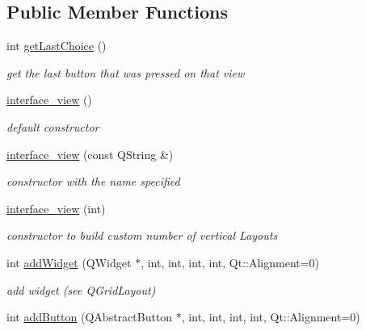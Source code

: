 \subsection*{Public Member Functions}
\begin{CompactItemize}
\item 
\hypertarget{classinterface__view_6c9506e36ddc99d55082b465e7fe89e7}{
int \hyperlink{classinterface__view_6c9506e36ddc99d55082b465e7fe89e7}{getLastChoice} ()}
\label{classinterface__view_6c9506e36ddc99d55082b465e7fe89e7}

\begin{CompactList}\small\item\em get the last button that was pressed on that view \item\end{CompactList}\item 
\hypertarget{classinterface__view_20cb4b527c4a0de449526e588e40498a}{
\hyperlink{classinterface__view_20cb4b527c4a0de449526e588e40498a}{interface\_\-view} ()}
\label{classinterface__view_20cb4b527c4a0de449526e588e40498a}

\begin{CompactList}\small\item\em default constructor \item\end{CompactList}\item 
\hypertarget{classinterface__view_3dc8b90c1b4ce4a59151ad7464e8fbb8}{
\hyperlink{classinterface__view_3dc8b90c1b4ce4a59151ad7464e8fbb8}{interface\_\-view} (const QString \&)}
\label{classinterface__view_3dc8b90c1b4ce4a59151ad7464e8fbb8}

\begin{CompactList}\small\item\em constructor with the name specified \item\end{CompactList}\item 
\hypertarget{classinterface__view_ac97156f648f7c66105da7c181974fae}{
\hyperlink{classinterface__view_ac97156f648f7c66105da7c181974fae}{interface\_\-view} (int)}
\label{classinterface__view_ac97156f648f7c66105da7c181974fae}

\begin{CompactList}\small\item\em constructor to build custom number of vertical Layouts \item\end{CompactList}\item 
int \hyperlink{classinterface__view_55fe3b79d276a6a477c2e1e5058cf52c}{addWidget} (QWidget $\ast$, int, int, int, int, Qt::Alignment=0)
\begin{CompactList}\small\item\em add widget (see QGridLayout) \item\end{CompactList}\item 
\hypertarget{classinterface__view_93faca1ba9dc78bd7e935b0fbbffaea8}{
int \hyperlink{classinterface__view_93faca1ba9dc78bd7e935b0fbbffaea8}{addButton} (QAbstractButton $\ast$, int, int, int, int, Qt::Alignment=0)}
\label{classinterface__view_93faca1ba9dc78bd7e935b0fbbffaea8}


\end{CompactItemize}
